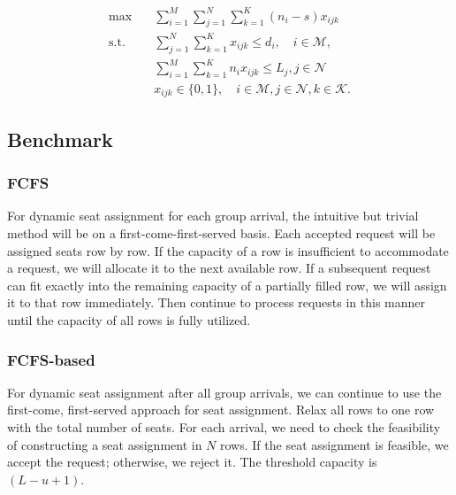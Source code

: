 
\begin{equation}
  \begin{aligned}
  \max \quad & \sum_{i=1}^{M}  \sum_{j= 1}^{N} \sum_{k = 1}^{K} (n_i- s) x_{ijk} \\
  \text {s.t.} \quad & \sum_{j= 1}^{N} \sum_{k= 1}^{K} x_{ijk} \leq d_{i}, \quad i \in \mathcal{M}, \\
  & \sum_{i=1}^{M} \sum_{k=1}^{K} n_{i} x_{ijk} \leq L_j, j \in \mathcal{N} \\
  & x_{ijk} \in \{0, 1\}, \quad i \in \mathcal{M}, j \in \mathcal{N}, k \in \mathcal{K}.
  \end{aligned}
\end{equation}

\subsection{Benchmark}
 

\subsubsection{FCFS}\label{largest_pattern}
For dynamic seat assignment for each group arrival, the intuitive but trivial method will be on a first-come-first-served basis. Each accepted request will be assigned seats row by row. If the capacity of a row is insufficient to accommodate a request, we will allocate it to the next available row. If a subsequent request can fit exactly into the remaining capacity of a partially filled row, we will assign it to that row immediately. Then continue to process requests in this manner until the capacity of all rows is fully utilized.



\subsubsection{FCFS-based}\label{FCFS-based}
For dynamic seat assignment after all group arrivals, we can continue to use the first-come, first-served approach for seat assignment. Relax all rows to one row with the total number of seats. For each arrival, we need to check the feasibility of constructing a seat assignment in $N$ rows. If the seat assignment is feasible, we accept the request; otherwise, we reject it. The threshold capacity is $(L -u +1)$.

